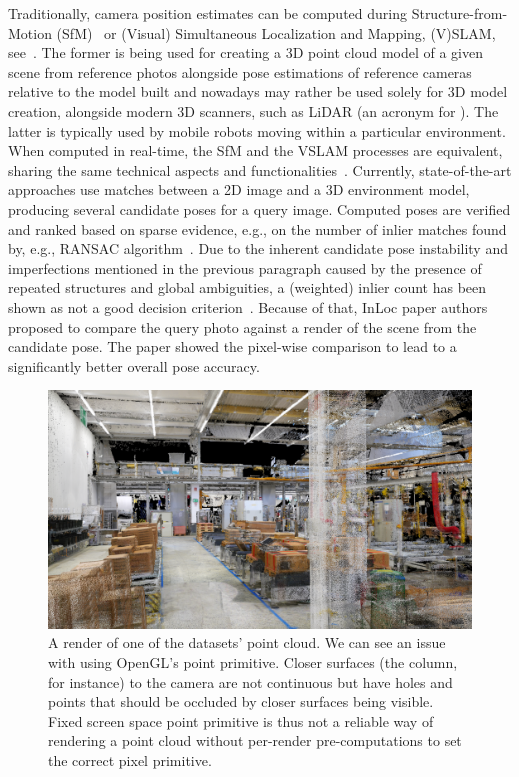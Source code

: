 Traditionally, camera position estimates can be computed during Structure-from-Motion (SfM)~\citep{SfM} or
(Visual) Simultaneous Localization and Mapping, (V)SLAM, see~\citet{SLAM}. The former is being used for creating
a 3D point cloud model of a given scene from reference photos alongside pose estimations of reference
cameras relative to the model built and nowadays may rather be used solely for 3D model creation, alongside
modern 3D scanners, such as LiDAR (an acronym for ).
The latter is typically used by mobile robots moving within
a particular environment. When computed in real-time, the SfM and the VSLAM processes
are equivalent, sharing the same technical aspects and functionalities~\citep{VNAV}. Currently,
state-of-the-art approaches use matches between a 2D image and a 3D environment model, 
producing several candidate poses for a query image. Computed poses are verified and ranked based %
on sparse evidence, e.g., on the number
of inlier matches found by, e.g., RANSAC algorithm~\citep{RANSAC}. Due to the inherent candidate pose
instability and imperfections mentioned in the previous paragraph caused by the presence of repeated structures and
global ambiguities, a (weighted) inlier count has been shown as not a good
decision criterion~\citep{Burstiness}. Because of that,  InLoc paper authors~\citet{InLoc} proposed to compare
the query photo against a render of the scene from the candidate pose. The paper showed the pixel-wise comparison
to lead to a significantly better overall pose accuracy.

\begin{figure}
    \centering
    \includegraphics[width=.9\textwidth]{../graphics/0217_pyrender_artwin_render.png}
    \caption[Basic OpenGL point cloud rendering example]{A render of one of the datasets'
    point cloud. We can see an issue with using OpenGL's point
    primitive. Closer surfaces (the column, for instance) to the camera are not continuous but have holes
    and points that should be occluded by closer surfaces being visible. Fixed screen space point
    primitive is thus not a reliable way of rendering a point cloud without per-render pre-computations
    to set the correct pixel primitive.}\label{fig:pyrender_artwin_render}
\end{figure}

